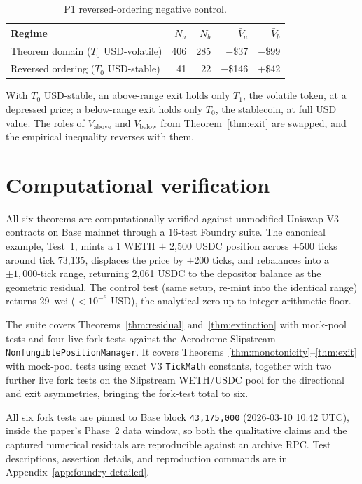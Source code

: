 \documentclass[11pt,a4paper]{article}
\theoremstyle{plain}
\begin{document}
\begin{table}[H]
\centering
\caption{P1 reversed-ordering negative control.}
\label{tab:exit-control}
\begin{tabular}{@{}lrrrr@{}}
\toprule
Regime & $N_a$ & $N_b$ & $\bar V_a$ & $\bar V_b$ \\
\midrule
Theorem domain ($T_0$ USD-volatile) & 406 & 285 & $-$\$37  & $-$\$99 \\
Reversed ordering ($T_0$ USD-stable) & 41  & 22  & $-$\$146 & $+$\$42 \\
\bottomrule
\end{tabular}
\end{table}

With $T_0$ USD-stable, an above-range exit holds only $T_1$, the volatile token, at a depressed price; a below-range exit holds only $T_0$, the stablecoin, at full USD value. The roles of $V_{\text{above}}$ and $V_{\text{below}}$ from Theorem~\ref{thm:exit} are swapped, and the empirical inequality reverses with them.

\section{Computational verification}\label{sec:foundry}

All six theorems are computationally verified against unmodified Uniswap V3 contracts on Base mainnet through a 16-test Foundry suite. The canonical example, Test~1, mints a 1 WETH $+$ 2{,}500 USDC position across $\pm 500$ ticks around tick 73{,}135, displaces the price by $+200$ ticks, and rebalances into a $\pm 1{,}000$-tick range, returning 2{,}061 USDC to the depositor balance as the geometric residual. The control test (same setup, re-mint into the identical range) returns 29~wei ($<\!10^{-6}$ USD), the analytical zero up to integer-arithmetic floor.

The suite covers Theorems~\ref{thm:residual} and~\ref{thm:extinction} with mock-pool tests and four live fork tests against the Aerodrome Slipstream \texttt{NonfungiblePositionManager}. It covers Theorems~\ref{thm:monotonicity}--\ref{thm:exit} with mock-pool tests using exact V3 \texttt{TickMath} constants, together with two further live fork tests on the Slipstream WETH/USDC pool for the directional and exit asymmetries, bringing the fork-test total to six.

All six fork tests are pinned to Base block \texttt{43{,}175{,}000} (2026-03-10 10:42 UTC), inside the paper's Phase~2 data window, so both the qualitative claims and the captured numerical residuals are reproducible against an archive RPC. Test descriptions, assertion details, and reproduction commands are in Appendix~\ref{app:foundry-detailed}.
\end{document}
